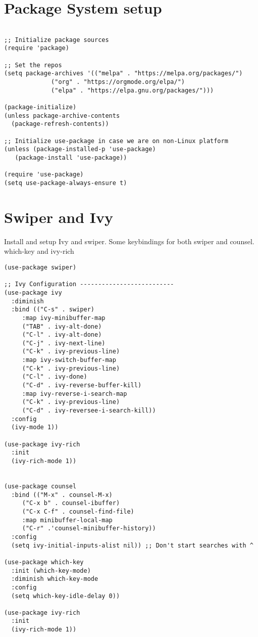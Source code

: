 \documentclass[11pt]{article}
\begin{document}
\section{Package System setup}
\label{sec:org12f1bc4}

\begin{verbatim}

;; Initialize package sources
(require 'package)

;; Set the repos
(setq package-archives '(("melpa" . "https://melpa.org/packages/")
			 ("org" . "https://orgmode.org/elpa/")
			 ("elpa" . "https://elpa.gnu.org/packages/")))

(package-initialize)
(unless package-archive-contents
  (package-refresh-contents))

;; Initialize use-package in case we are on non-Linux platform
(unless (package-installed-p 'use-package)
   (package-install 'use-package))

(require 'use-package)
(setq use-package-always-ensure t)

\end{verbatim}

\section{Swiper and Ivy}
\label{sec:org39feee8}

Install and setup Ivy and swiper. Some keybindings for both swiper and counsel. which-key and ivy-rich

\begin{verbatim}
(use-package swiper)

;; Ivy Configuration --------------------------
(use-package ivy
  :diminish
  :bind (("C-s" . swiper)
	 :map ivy-minibuffer-map
	 ("TAB" . ivy-alt-done)
	 ("C-l" . ivy-alt-done)
	 ("C-j" . ivy-next-line)
	 ("C-k" . ivy-previous-line)
	 :map ivy-switch-buffer-map
	 ("C-k" . ivy-previous-line)
	 ("C-l" . ivy-done)
	 ("C-d" . ivy-reverse-buffer-kill)
	 :map ivy-reverse-i-search-map
	 ("C-k" . ivy-previous-line)
	 ("C-d" . ivy-reversee-i-search-kill))
  :config
  (ivy-mode 1))

(use-package ivy-rich
  :init
  (ivy-rich-mode 1))


(use-package counsel
  :bind (("M-x" . counsel-M-x)
	 ("C-x b" . counsel-ibuffer)
	 ("C-x C-f" . counsel-find-file)
	 :map minibuffer-local-map
	 ("C-r" .'counsel-minibuffer-history))
  :config
  (setq ivy-initial-inputs-alist nil)) ;; Don't start searches with ^

(use-package which-key
  :init (which-key-mode)
  :diminish which-key-mode
  :config
  (setq which-key-idle-delay 0))

(use-package ivy-rich
  :init
  (ivy-rich-mode 1))

\end{verbatim}
\end{document}
